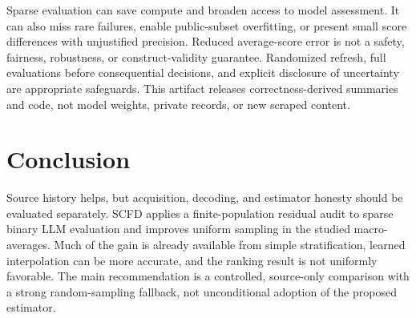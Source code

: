 \documentclass{article}
\begin{document}
Sparse evaluation can save compute and broaden access to model assessment. It can also miss rare failures, enable public-subset overfitting, or present small score differences with unjustified precision. Reduced average-score error is not a safety, fairness, robustness, or construct-validity guarantee. Randomized refresh, full evaluations before consequential decisions, and explicit disclosure of uncertainty are appropriate safeguards. This artifact releases correctness-derived summaries and code, not model weights, private records, or new scraped content.

\section{Conclusion}
Source history helps, but acquisition, decoding, and estimator honesty should be evaluated separately. SCFD applies a finite-population residual audit to sparse binary LLM evaluation and improves uniform sampling in the studied macro-averages. Much of the gain is already available from simple stratification, learned interpolation can be more accurate, and the ranking result is not uniformly favorable. The main recommendation is a controlled, source-only comparison with a strong random-sampling fallback, not unconditional adoption of the proposed estimator.

\clearpage


\clearpage
\appendix

\clearpage

\end{document}
